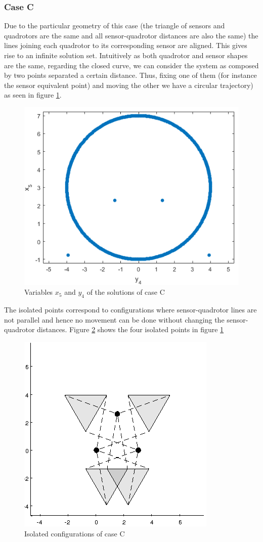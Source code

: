 \documentclass[paper=a4, fontsize=11pt]{scrartcl} %
\begin{document}
\subsubsection*{Case C}
Due to the particular geometry of this case (the triangle of sensors and quadrotors are the same and all sensor-quadrotor distances are also the same) the lines joining each quadrotor to its corresponding sensor are aligned. This gives rise to an infinite solution set. Intuitively as both quadrotor and sensor shapes are the same, regarding the closed curve, we can consider the system as composed by two points separated a certain distance. Thus, fixing one of them (for instance the sensor equivalent point) and moving the other we have a circular trajectory) as seen in figure \ref{fig:p2D_C}. 
\begin{figure}[H]
	\begin{center}
		\includegraphics[width=0.5\linewidth]{p2D_C.png} 
	\caption{Variables $x_5$ and $y_4$ of the solutions of case C}
	\label{fig:p2D_C}
	\end{center}
\end{figure}

The isolated points correspond to configurations where sensor-quadrotor lines are not parallel and hence no movement can be done without changing the sensor-quadrotor distances. Figure \ref{7c} shows the four isolated points in figure \ref{fig:p2D_C}

\begin{figure}[H]
	\begin{center}
		\includegraphics[width=0.5\linewidth]{7c.png} 
	\caption{Isolated configurations of case C}
	\label{7c}
	\end{center}
\end{figure}
\end{document}
